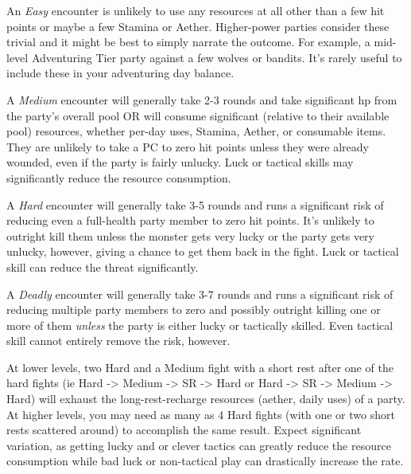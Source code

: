 \documentclass[10pt,twoside,openany,bg=none]{dndbook}
\begin{document}
An \textit{Easy} encounter is unlikely to use any resources at all other than a few hit points or maybe a few Stamina or Aether. Higher-power parties consider these trivial and it might be best to simply narrate the outcome. For example, a mid-level Adventuring Tier party against a few wolves or bandits. It's rarely useful to include these in your adventuring day balance.

A \textit{Medium} encounter will generally take 2-3 rounds and take significant hp from the party's overall pool OR will consume significant (relative to their available pool) resources, whether per-day uses, Stamina, Aether, or consumable items. They are unlikely to take a PC to zero hit points unless they were already wounded, even if the party is fairly unlucky. Luck or tactical skills may significantly reduce the resource consumption.

A \textit{Hard} encounter will generally take 3-5 rounds and runs a significant risk of reducing even a full-health party member to zero hit points. It's unlikely to outright kill them unless the monster gets very lucky or the party gets very unlucky, however, giving a chance to get them back in the fight. Luck or tactical skill can reduce the threat significantly.

A \textit{Deadly} encounter will generally take 3-7 rounds and runs a significant risk of reducing multiple party members to zero and possibly outright killing one or more of them \textit{unless} the party is either lucky or tactically skilled. Even tactical skill cannot entirely remove the risk, however.

At lower levels, two Hard and a Medium fight with a short rest after one of the hard fights (ie Hard -> Medium -> SR -> Hard or Hard -> SR -> Medium -> Hard) will exhaust the long-rest-recharge resources (aether, daily uses) of a party. At higher levels, you may need as many as 4 Hard fights (with one or two short rests scattered around) to accomplish the same result. Expect significant variation, as getting lucky and or clever tactics can greatly reduce the resource consumption while bad luck or non-tactical play can drastically increase the rate.
\end{document}
